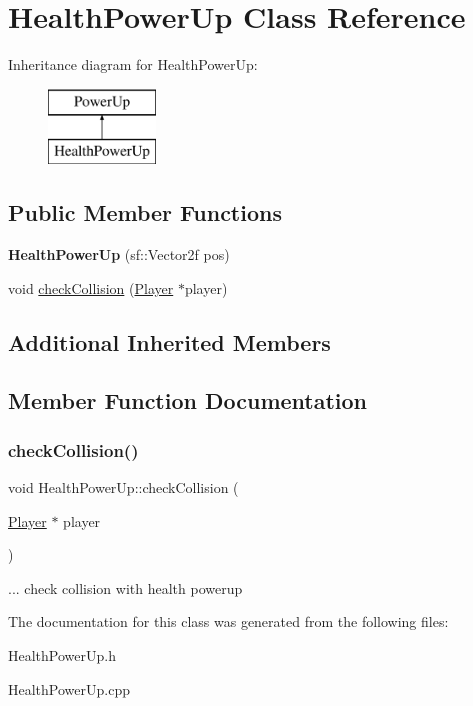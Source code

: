 \hypertarget{class_health_power_up}{}\section{Health\+Power\+Up Class Reference}
\label{class_health_power_up}
Inheritance diagram for Health\+Power\+Up\+:\begin{figure}[H]
\begin{center}
\leavevmode
\includegraphics[height=2.000000cm]{class_health_power_up}
\end{center}
\end{figure}
\subsection*{Public Member Functions}
\begin{DoxyCompactItemize}
\item 
\mbox{\label{class_health_power_up_a4324428f812fbf45c59b0bbaa94bdd7b}} 
{\bfseries Health\+Power\+Up} (sf\+::\+Vector2f pos)
\item 
void \mbox{\hyperlink{class_health_power_up_a71721090118d9f61b57233b85ae65eca}{check\+Collision}} (\mbox{\hyperlink{class_player}{Player}} $\ast$player)
\end{DoxyCompactItemize}
\subsection*{Additional Inherited Members}


\subsection{Member Function Documentation}
\mbox{\label{class_health_power_up_a71721090118d9f61b57233b85ae65eca}} 
\subsubsection{\texorpdfstring{check\+Collision()}{checkCollision()}}
{\footnotesize\ttfamily void Health\+Power\+Up\+::check\+Collision (\begin{DoxyParamCaption}\item[{\mbox{\hyperlink{class_player}{Player}} $\ast$}]{player }\end{DoxyParamCaption})}

... check collision with health powerup

The documentation for this class was generated from the following files\+:\begin{DoxyCompactItemize}
\item 
Health\+Power\+Up.\+h\item 
Health\+Power\+Up.\+cpp\end{DoxyCompactItemize}
